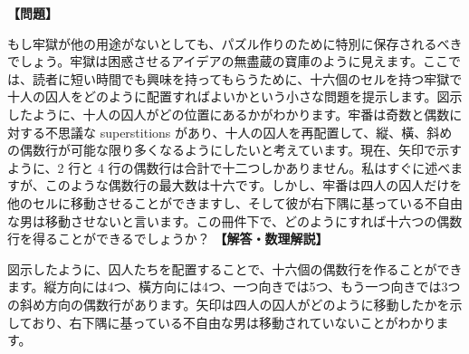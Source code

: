 \documentclass[10pt,a4paper,oneside,openany]{ltjsbook}
\begin{document}
\begin{tcolorbox}[colback=softblue,colframe=primaryblue,title=\textbf{第 225 問：十人の囚人 （原題: THE TEN PRISONERS.）},arc=2mm,boxrule=1pt,breakable]
\textbf{【問題】}\par\vspace{0.3em}
もし牢獄が他の用途がないとしても、パズル作りのために特別に保存されるべきでしょう。牢獄は困惑させるアイデアの無盡蔵の寶庫のように見えます。ここでは、読者に短い時間でも興味を持ってもらうために、十六個のセルを持つ牢獄で十人の囚人をどのように配置すればよいかという小さな問題を提示します。図示したように、十人の囚人がどの位置にあるかがわかります。牢番は奇数と偶数に対する不思議な superstitions があり、十人の囚人を再配置して、縦、橫、斜めの偶数行が可能な限り多くなるようにしたいと考えています。現在、矢印で示すように、2 行と 4 行の偶数行は合計で十二つしかありません。私はすぐに述べますが、このような偶数行の最大数は十六です。しかし、牢番は四人の囚人だけを他のセルに移動させることができますし、そして彼が右下隅に基っている不自由な男は移動させないと言います。この冊件下で、どのようにすれば十六つの偶数行を得ることができるでしょうか？
\tcblower
\textbf{【解答・数理解説】}\par\vspace{0.3em}
図示したように、囚人たちを配置することで、十六個の偶数行を作ることができます。縦方向には4つ、橫方向には4つ、一つ向きでは5つ、もう一つ向きでは3つの斜め方向の偶数行があります。矢印は四人の囚人がどのように移動したかを示しており、右下隅に基っている不自由な男は移動されていないことがわかります。
\end{tcolorbox}
\end{document}
